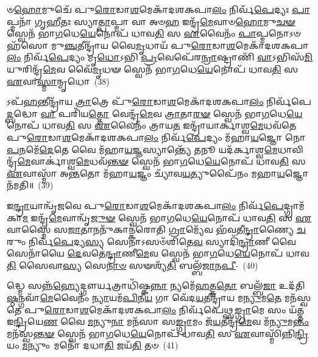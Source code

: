 𑍞\-\ul{𑌹𑍋}\-𑌮𑍁𑌚𑍇᳴ 𑌪𑍁\-\ul{𑌰𑍋}\-𑌡𑌾\-\ul{𑌶}\-𑌮𑍇𑌕𑌾᳴\-𑌦𑌶\-𑌕𑌪𑌾\-\ul{𑌲𑌂} 𑌨𑌿𑌰𑍍𑌵᳴\-\ul{𑌪𑍇}\-𑌦𑍍𑌯𑌃 \ul{𑌪𑌾}\-𑌪𑍍𑌮𑌨𑌾᳴ 𑌗𑍃\-\ul{𑌹𑍀}\-𑌤𑌃 𑌸𑍍𑌯𑌾\-\ul{𑌤𑍍𑌪𑌾}\-𑌪𑍍𑌮𑌾 𑌵𑌾 𑌅𑍞\-\ul{𑌹} 𑌇𑌨𑍍𑌦𑍍𑌰᳴\-\ul{𑌮𑍇}\-𑌵𑌾𑍞\-\ul{𑌹𑍋}\-𑌮𑍁\-\ul{𑌚}\-\-\ul{𑍟} 𑌸𑍍𑌵𑍇𑌨᳴ 𑌭𑌾\-\ul{𑌗}\-𑌧𑍇\-\ul{𑌯𑍇}\-𑌨𑍋𑌪᳴ 𑌧𑌾𑌵\-\ul{𑌤𑌿} 𑌸 \ul{𑌏}\-𑌵𑍈𑌨𑌂᳴ \ul{𑌪𑌾}\-𑌪𑍍𑌮𑌨𑍋\-𑌽𑍞𑌹᳴𑌸𑍋 𑌮𑍁\-\ul{𑌞𑍍𑌚}\-𑌤𑍀𑌨𑍍𑌦𑍍𑌰𑌾᳴𑌯 𑌵𑍈\-\ul{𑌮𑍃}\-𑌧𑌾𑌯᳴ 𑌪𑍁\-\ul{𑌰𑍋}\-𑌡𑌾\-\ul{𑌶}\-𑌮𑍇𑌕𑌾᳴\-𑌦𑌶\-𑌕𑌪𑌾\-\ul{𑌲𑌂} 𑌨𑌿𑌰𑍍𑌵᳴\-\ul{𑌪𑍇}\-𑌦𑍍𑌯𑌂 𑌮𑍃\-\ul{𑌧𑍋}\-\-𑌽𑌭𑌿 \ul{𑌪𑍍𑌰}\-𑌵𑍇𑌪𑍇᳴𑌰\-\ul{𑌨𑍍𑌰𑌾}\-𑌷𑍍𑌟𑍍𑌰𑌾𑌣𑌿᳴ \ul{𑌵𑌾}\-\-𑌽𑌭𑌿𑌸᳴\-\ul{𑌮𑌿}\-𑌯𑍁𑌰𑌿𑌨𑍍𑌦𑍍𑌰᳴\-\ul{𑌮𑍇}\-𑌵 𑌵𑍈᳴\-\ul{𑌮𑍃}\-𑌧𑍟 𑌸𑍍𑌵𑍇𑌨᳴ 𑌭𑌾\-\ul{𑌗}\-𑌧𑍇\-\ul{𑌯𑍇}\-𑌨𑍋𑌪᳴ 𑌧𑌾𑌵\-\ul{𑌤𑌿} 𑌸 \ul{𑌏}\-𑌵𑌾\-\ul{𑌸𑍍𑌮𑌾}\-𑌨𑍍𑌮𑍃𑌧𑍋~(38)

𑌽𑌪᳴\-\ul{𑌹}\-𑌨𑍍𑌤𑍀𑌨𑍍𑌦𑍍𑌰𑌾᳴𑌯 \ul{𑌤𑍍𑌰𑌾}\-𑌤𑍍𑌰𑍇 𑌪𑍁᳴\-\ul{𑌰𑍋}\-𑌡𑌾\-\ul{𑌶}\-𑌮𑍇𑌕𑌾᳴\-𑌦𑌶\-𑌕𑌪𑌾\-\ul{𑌲𑌂} 𑌨𑌿𑌰𑍍𑌵᳴𑌪𑍇\-\ul{𑌦𑍍𑌬}\-𑌦𑍍𑌧𑍋 \ul{𑌵𑌾} 𑌪𑌰𑌿᳴𑌯\-\ul{𑌤𑍍𑌤𑍋} 𑌵𑍇𑌨𑍍𑌦𑍍𑌰᳴\-\ul{𑌮𑍇}\-𑌵 \ul{𑌤𑍍𑌰𑌾}\-𑌤𑌾\-\ul{𑌰}\-\-\ul{𑍟} 𑌸𑍍𑌵𑍇𑌨᳴ 𑌭𑌾\-\ul{𑌗}\-𑌧𑍇\-\ul{𑌯𑍇}\-𑌨𑍋𑌪᳴ 𑌧𑌾𑌵\-\ul{𑌤𑌿} 𑌸 \ul{𑌏}\-𑌵𑍈𑌨𑌂᳴ 𑌤𑍍𑌰𑌾𑌯\-\ul{𑌤} 𑌇𑌨𑍍𑌦𑍍𑌰𑌾᳴𑌯𑌾𑌰𑍍𑌕𑌾𑌶𑍍𑌵\-\ul{𑌮𑍇}\-𑌧𑌵᳴𑌤𑍇 𑌪𑍁\-\ul{𑌰𑍋}\-𑌡𑌾\-\ul{𑌶}\-𑌮𑍇𑌕𑌾᳴\-𑌦𑌶\-𑌕𑌪𑌾\-\ul{𑌲𑌂} 𑌨𑌿𑌰𑍍𑌵᳴\-\ul{𑌪𑍇}\-𑌦𑍍𑌯𑌂 𑌮᳴𑌹𑌾\-\ul{𑌯}\-𑌜𑍍𑌞𑍋 𑌨𑍋\-\ul{𑌪}\-𑌨𑌮𑍇᳴\-\ul{𑌦𑍇}\-𑌤𑍇 𑌵𑍈 𑌮᳴𑌹𑌾\-\ul{𑌯}\-𑌜𑍍𑌞𑌸𑍍𑌯𑌾𑌨𑍍𑌤𑍍𑌯𑍇᳴ \ul{𑌤}\-𑌨𑍂 𑌯𑌦᳴𑌰𑍍𑌕𑌾𑌶𑍍𑌵\-\ul{𑌮𑍇}\-𑌧𑌾𑌵𑌿𑌨𑍍𑌦𑍍𑌰᳴\-\ul{𑌮𑍇}\-𑌵𑌾𑌰𑍍𑌕𑌾॑𑌶𑍍𑌵\-\ul{𑌮𑍇}\-𑌧𑌵᳴\-\ul{𑌨𑍍𑌤}\-\-\ul{𑍟} 𑌸𑍍𑌵𑍇𑌨᳴ 𑌭𑌾\-\ul{𑌗}\-𑌧𑍇\-\ul{𑌯𑍇}\-𑌨𑍋𑌪᳴ 𑌧𑌾𑌵\-\ul{𑌤𑌿} 𑌸 \ul{𑌏}\-𑌵𑌾𑌸𑍍𑌮𑌾᳴ 𑌅\-\ul{𑌨𑍍𑌤}\-𑌤𑍋 𑌮᳴𑌹𑌾\-\ul{𑌯}\-𑌜𑍍𑌞𑌂 𑌚𑍍𑌯𑌾᳴𑌵\-\ul{𑌯}\-𑌤𑍍𑌯𑍁𑌪𑍈᳴𑌨𑌂 𑌮𑌹𑌾\-\ul{𑌯}\-𑌜𑍍𑌞𑍋 𑌨᳴𑌮𑌤𑌿॥~(39)

{\anuvakamend[{\-\ul{𑌇}\-\-\ul{𑌨𑍍𑌦𑍍𑌰𑌿}\-𑌯𑌾𑌵᳴\-\ul{𑌨𑍍𑌤}\-\-\ul{𑍟} 𑌸𑍍𑌵𑍇𑌨᳴ 𑌭𑌾\-\ul{𑌗}\-𑌧𑍇\-\ul{𑌯𑍇}\-𑌨𑍋𑌪᳴ 𑌧𑌾𑌵\-\ul{𑌤𑌿} 𑌸𑍋॑\-𑌽𑌰𑍍𑌕𑌵᳴\-\ul{𑌨𑍍𑌤}\-\-\ul{𑍟} 𑌸𑍍𑌵𑍇𑌨᳴ 𑌭𑌾\-\ul{𑌗}\-𑌧𑍇𑌯𑍇᳴\-\ul{𑌨𑍈}\-𑌵𑍇𑌨𑍍𑌦𑍍𑌰𑌾᳴𑌯𑌾\-\ul{𑌸𑍍𑌮𑌾}\-𑌨𑍍𑌮𑍃𑌧𑍋॑\-𑌽𑌸𑍍𑌮𑍈 \ul{𑌸}\-𑌪𑍍𑌤 𑌚᳴}]}

𑌇\-\ul{𑌨𑍍𑌦𑍍𑌰𑌾}\-𑌯𑌾𑌨𑍍𑌵𑍃᳴𑌜𑌵𑍇 𑌪𑍁\-\ul{𑌰𑍋}\-𑌡𑌾\-\ul{𑌶}\-𑌮𑍇𑌕𑌾᳴\-𑌦𑌶\-𑌕𑌪𑌾\-\ul{𑌲𑌂} 𑌨𑌿𑌰𑍍𑌵᳴\-\ul{𑌪𑍇}\-𑌦𑍍𑌗𑍍𑌰𑌾𑌮᳴𑌕𑌾\-\ul{𑌮} 𑌇𑌨𑍍𑌦𑍍𑌰᳴\-\ul{𑌮𑍇}\-𑌵𑌾𑌨𑍍𑌵𑍃᳴\-\ul{𑌜𑍁}\-\-\ul{𑍟} 𑌸𑍍𑌵𑍇𑌨᳴ 𑌭𑌾\-\ul{𑌗}\-𑌧𑍇\-\ul{𑌯𑍇}\-𑌨𑍋𑌪᳴ 𑌧𑌾𑌵\-\ul{𑌤𑌿} 𑌸 \ul{𑌏}\-𑌵𑌾𑌸𑍍𑌮𑍈᳴ 𑌸\-\ul{𑌜𑌾}\-𑌤𑌾𑌨𑌨𑍁᳴𑌕𑌾𑌨𑍍𑌕𑌰𑍋𑌤𑌿 \ul{𑌗𑍍𑌰𑌾}\-𑌮𑍍𑌯𑍇᳴𑌵 𑌭᳴𑌵𑌤𑍀\-\ul{𑌨𑍍𑌦𑍍𑌰𑌾}\-𑌣𑍍𑌯𑍈 \ul{𑌚}\-𑌰𑍁𑌂 𑌨𑌿𑌰𑍍𑌵᳴\-\ul{𑌪𑍇}\-𑌦𑍍𑌯\-\ul{𑌸𑍍𑌯} 𑌸𑍇𑌨𑌾\-𑌽𑌸𑍞᳴𑌶𑌿𑌤𑍇\-\ul{𑌵} 𑌸𑍍𑌯𑌾𑌦𑌿᳴\-\ul{𑌨𑍍𑌦𑍍𑌰𑌾}\-𑌣𑍀 𑌵𑍈 𑌸𑍇𑌨𑌾᳴𑌯𑍈 \ul{𑌦𑍇}\-𑌵𑌤𑍇॑\-\ul{𑌨𑍍𑌦𑍍𑌰𑌾}\-𑌣𑍀\-\ul{𑌮𑍇}\-𑌵 𑌸𑍍𑌵𑍇𑌨᳴ 𑌭𑌾\-\ul{𑌗}\-𑌧𑍇\-\ul{𑌯𑍇}\-𑌨𑍋𑌪᳴ 𑌧𑌾𑌵\-\ul{𑌤𑌿} 𑌸𑍈𑌵𑌾\-\ul{𑌸𑍍𑌯} 𑌸𑍇\-\ul{𑌨𑌾}\-\-\ul{𑍞} 𑌸𑍟𑌶𑍍𑌯᳴\-\ul{𑌤𑌿} 𑌬𑌲𑍍𑌬᳴\-\ul{𑌜𑌾}\-𑌨\-\ul{𑌪𑍀}\--~(40)

𑌦𑍍𑌧𑍍𑌮𑍇 𑌸𑌨𑍍𑌨᳴\-\ul{𑌹𑍍𑌯𑍇}\-𑌦𑍍𑌗𑍗𑌰𑍍𑌯𑌤𑍍𑌰𑌾𑌧𑌿᳴𑌷𑍍𑌕\-\ul{𑌨𑍍𑌨𑌾} 𑌨𑍍𑌯𑌮𑍇᳴\-\ul{𑌹}\-𑌤𑍍𑌤\-\ul{𑌤𑍋} 𑌬𑌲𑍍𑌬᳴\-\ul{𑌜𑌾} 𑌉𑌦᳴𑌤𑌿\-\ul{𑌷𑍍𑌠}\-𑌨𑍍𑌗𑌵𑌾᳴\-\ul{𑌮𑍇}\-𑌵𑍈𑌨𑌂᳴ \ul{𑌨𑍍𑌯𑌾}\-𑌯𑌮᳴\-\ul{𑌪𑌿}\-𑌨𑍀\-\ul{𑌯} 𑌗𑌾 𑌵𑍇᳴𑌦\-\ul{𑌯}\-𑌤𑍀𑌨𑍍𑌦𑍍𑌰𑌾᳴𑌯 𑌮\-\ul{𑌨𑍍𑌯𑍁}\-𑌮\-\ul{𑌤𑍇} 𑌮𑌨᳴𑌸𑍍𑌵𑌤𑍇 𑌪𑍁\-\ul{𑌰𑍋}\-𑌡𑌾\-\ul{𑌶}\-𑌮𑍇𑌕𑌾᳴\-𑌦𑌶\-𑌕𑌪𑌾\-\ul{𑌲𑌂} 𑌨𑌿𑌰𑍍𑌵᳴𑌪𑍇𑌥𑍍𑌸\-\ul{𑌙𑍍𑌗𑍍𑌰𑌾}\-𑌮𑍇 𑌸𑌂 𑌯᳴𑌤𑍍𑌤 𑌇\-\ul{𑌨𑍍𑌦𑍍𑌰𑌿}\-𑌯𑍇\-\ul{𑌣} 𑌵𑍈 \ul{𑌮}\-𑌨𑍍𑌯𑍁\-\ul{𑌨𑌾} 𑌮𑌨᳴𑌸𑌾 𑌸\-\ul{𑌙𑍍𑌗𑍍𑌰𑌾}\-𑌮𑌂 𑌜᳴\-\ul{𑌯}\-𑌤𑍀𑌨𑍍𑌦𑍍𑌰᳴\-\ul{𑌮𑍇}\-𑌵 𑌮᳴\-\ul{𑌨𑍍𑌯𑍁}\-𑌮\-\ul{𑌨𑍍𑌤𑌂} 𑌮𑌨᳴𑌸𑍍𑌵\-\ul{𑌨𑍍𑌤}\-\-\ul{𑍟} 𑌸𑍍𑌵𑍇𑌨᳴ 𑌭𑌾\-\ul{𑌗}\-𑌧𑍇\-\ul{𑌯𑍇}\-𑌨𑍋𑌪᳴ 𑌧𑌾𑌵\-\ul{𑌤𑌿} 𑌸 \ul{𑌏}\-𑌵𑌾𑌸𑍍𑌮𑌿᳴𑌨𑍍𑌨𑌿\-\ul{𑌨𑍍𑌦𑍍𑌰𑌿}\-𑌯𑌂 \ul{𑌮}\-𑌨𑍍𑌯𑍁𑌂 𑌮𑌨𑍋᳴ 𑌦𑌧𑌾\-\ul{𑌤𑌿} 𑌜𑌯᳴\-\ul{𑌤𑌿} 𑌤𑍞~(41)

